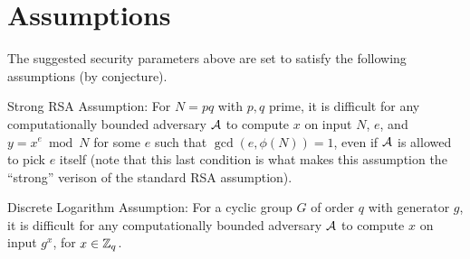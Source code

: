 \section{Assumptions}
The suggested security parameters above are set to satisfy the following 
assumptions (by conjecture).

Strong RSA Assumption: For $N = pq$ with $p,q$ prime, it is difficult for any
computationally bounded adversary $\mathcal{A}$ to compute $x$ on input $N$, $e$, and 
$y=x^e\bmod N$
for some $e$ such that $\gcd(e,\phi(N)) = 1$, even if $\mathcal{A}$ is allowed to pick 
$e$ itself (note that this last condition is what makes this assumption the
``strong'' verison of the standard RSA assumption).

Discrete Logarithm Assumption: For a cyclic group $G$ of order $q$ with
generator $g$, it is difficult for any computationally bounded adversary $\mathcal{A}$ 
to compute $x$ on input $g^x$, for $x\in{\mathbb{Z}_q}$.
